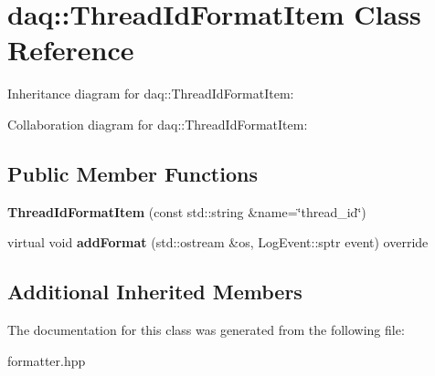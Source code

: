 \hypertarget{classdaq_1_1ThreadIdFormatItem}{}\section{daq\+:\+:Thread\+Id\+Format\+Item Class Reference}
\label{classdaq_1_1ThreadIdFormatItem}


Inheritance diagram for daq\+:\+:Thread\+Id\+Format\+Item\+:


Collaboration diagram for daq\+:\+:Thread\+Id\+Format\+Item\+:
\subsection*{Public Member Functions}
\begin{DoxyCompactItemize}
\item 
\mbox{\label{classdaq_1_1ThreadIdFormatItem_adc5825807cf9a560279c0c4c0bc7e6d7}} 
{\bfseries Thread\+Id\+Format\+Item} (const std\+::string \&name=\char`\"{}thread\+\_\+id\char`\"{})
\item 
\mbox{\label{classdaq_1_1ThreadIdFormatItem_a5cd6974d7194d78e12307990968fecc6}} 
virtual void {\bfseries add\+Format} (std\+::ostream \&os, Log\+Event\+::sptr event) override
\end{DoxyCompactItemize}
\subsection*{Additional Inherited Members}


The documentation for this class was generated from the following file\+:\begin{DoxyCompactItemize}
\item 
formatter.\+hpp\end{DoxyCompactItemize}
